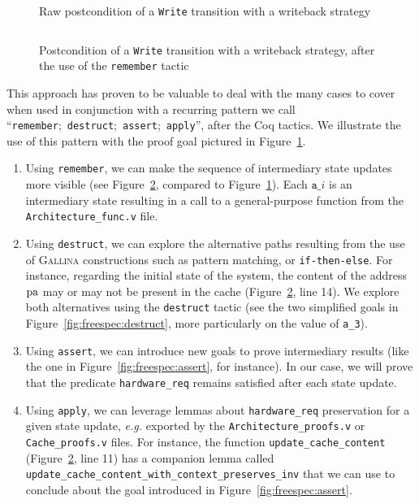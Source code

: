 \begin{figure}
  \inputminted{coq}{Listings/StateHell.v}

  \caption{Raw postcondition of a \texttt{Write} transition with a writeback
    strategy}
  \label{fig:freespec:entrypoint}
\end{figure}

\begin{figure}
  \inputminted{coq}{Listings/RememberPattern.v}

  \caption{Postcondition of a \texttt{Write} transition with a writeback
    strategy, after the use of the \texttt{remember} tactic}
  \label{fig:freespec:remember}
\end{figure}

This approach has proven to be valuable to deal with the many cases to cover
when used in conjunction with a recurring pattern we call
``\texttt{remember};~\texttt{destruct};~\texttt{assert};~\texttt{apply}'', after
the Coq tactics.
%
We illustrate the use of this pattern with the proof goal pictured in
Figure~\ref{fig:freespec:entrypoint}.
%
\begin{enumerate}
\item Using \texttt{remember}, we can make the sequence of intermediary state
  updates more visible (see Figure~\ref{fig:freespec:remember}, compared to
  Figure~\ref{fig:freespec:entrypoint}).
  Each \( \mathtt{a\_}i \) is an intermediary state resulting in a call to a
  general-purpose function from the \texttt{Architecture\_func.v} file.
\item Using \texttt{destruct}, we can explore the alternative paths resulting
  from the use of {\scshape Gallina} constructions such as pattern matching, or
  \texttt{if-then-else}.
  For instance, regarding the initial state of the system, the content of the
  address \( \mathrm{pa} \) may or may not be present in the cache
  (Figure~\ref{fig:freespec:remember}, line 14).
  We explore both alternatives using the \texttt{destruct} tactic (see the
  two simplified goals in Figure~\ref{fig:freespec:destruct}, more particularly
  on the value of \texttt{a\_3}).
\item Using \texttt{assert}, we can introduce new goals to prove intermediary
  results (like the one in Figure~\ref{fig:freespec:assert}, for instance).
  In our case, we will prove that the predicate \texttt{hardware\_req} remains
  satisfied after each state update.
\item Using \texttt{apply}, we can leverage lemmas about \texttt{hardware\_req}
  preservation for a given state update, \emph{e.g.} exported by the
  \texttt{Architecture\_proofs.v} or \texttt{Cache\_proofs.v} files.
  For instance, the function \texttt{update\_cache\_content}
  (Figure~\ref{fig:freespec:remember}, line 11) has a companion lemma called
  \texttt{update\_cache\_content\-\_with\_context\_preserves\_inv} that we can
  use to conclude about the goal introduced in Figure~\ref{fig:freespec:assert}.
\end{enumerate}

